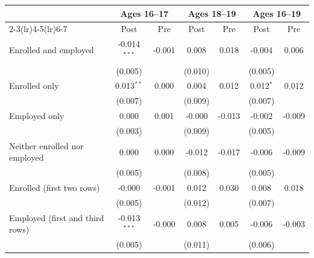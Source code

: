 \begin{tabular}{lcccccc}
\toprule
 & \multicolumn{2}{c}{Ages 16--17} & \multicolumn{2}{c}{Ages 18--19} & \multicolumn{2}{c}{Ages 16--19} \\
\cmidrule(lr){2-3}\cmidrule(lr){4-5}\cmidrule(lr){6-7}
 & Post & Pre & Post & Pre & Post & Pre \\
\midrule
Enrolled and employed & -0.014$^{***}$ & -0.001 & 0.008 & 0.018 & -0.004 & 0.006 \\
 & (0.005) &  & (0.010) &  & (0.005) &  \\
Enrolled only & 0.013$^{**}$ & 0.000 & 0.004 & 0.012 & 0.012$^{*}$ & 0.012 \\
 & (0.007) &  & (0.009) &  & (0.007) &  \\
Employed only & 0.000 & 0.001 & -0.000 & -0.013 & -0.002 & -0.009 \\
 & (0.003) &  & (0.009) &  & (0.005) &  \\
Neither enrolled nor employed & 0.000 & 0.000 & -0.012 & -0.017 & -0.006 & -0.009 \\
 & (0.005) &  & (0.008) &  & (0.005) &  \\
Enrolled (first two rows) & -0.000 & -0.001 & 0.012 & 0.030 & 0.008 & 0.018 \\
 & (0.005) &  & (0.012) &  & (0.007) &  \\
Employed (first and third rows) & -0.013$^{***}$ & -0.000 & 0.008 & 0.005 & -0.006 & -0.003 \\
 & (0.005) &  & (0.011) &  & (0.006) &  \\
\bottomrule
\end{tabular}
